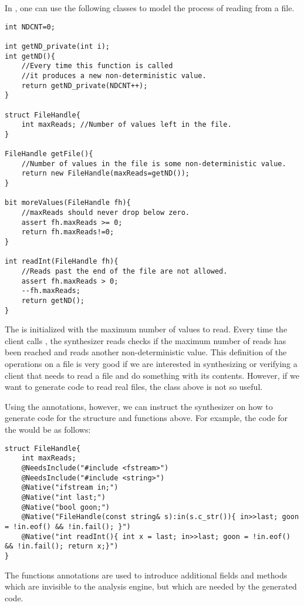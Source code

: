 \begin{Example}
In \Sk{}, one can use the following classes to model the process of reading from a file.

\begin{lstlisting}
int NDCNT=0;

int getND_private(int i);
int getND(){
    //Every time this function is called
    //it produces a new non-deterministic value.
    return getND_private(NDCNT++);
}

struct FileHandle{
    int maxReads; //Number of values left in the file.
}

FileHandle getFile(){
    //Number of values in the file is some non-deterministic value.
    return new FileHandle(maxReads=getND());
}

bit moreValues(FileHandle fh){
    //maxReads should never drop below zero.
    assert fh.maxReads >= 0;
    return fh.maxReads!=0;
}

int readInt(FileHandle fh){
    //Reads past the end of the file are not allowed.
    assert fh.maxReads > 0;
    --fh.maxReads;
    return getND();
}
\end{lstlisting}

The  is initialized with the maximum number of values to read. Every time the client calls , the synthesizer reads checks if the maximum number of reads has been reached and reads another non-deterministic value. This definition of the operations on a file is very good if we are interested in synthesizing or verifying a client that needs to read a file and do something with its contents. However, if we want to generate code to read real files, the class above is not so useful.

Using the  annotations, however, we can instruct the synthesizer on how to generate code for the structure and functions above. For example, the code for the  would be as follows:

\begin{lstlisting}
struct FileHandle{
    int maxReads;
    @NeedsInclude("#include <fstream>")
    @NeedsInclude("#include <string>")
    @Native("ifstream in;")
    @Native("int last;")
    @Native("bool goon;")
    @Native("FileHandle(const string& s):in(s.c_str()){ in>>last; goon = !in.eof() && !in.fail(); }")
    @Native("int readInt(){ int x = last; in>>last; goon = !in.eof() && !in.fail(); return x;}")
}
\end{lstlisting}
The functions annotations are used to introduce additional fields and methods which are invisible to the analysis engine, but which are needed by the generated code.


\end{Example}

